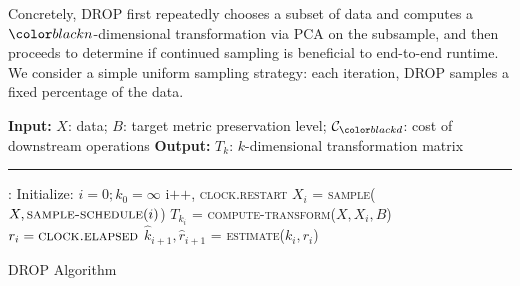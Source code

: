 Concretely, DROP first repeatedly chooses a subset of data and computes a $\dvar$-dimensional transformation via PCA on the subsample, and then proceeds to determine if continued sampling is beneficial to end-to-end runtime.
We consider a simple uniform sampling strategy: each iteration, DROP samples a fixed percentage of the data.
 
 
 
 
 


\begin{algorithm}[t!]
\begin{algorithmic}[1]
\small
\Statex \textbf{Input:}  $X$: data; $B$: target metric preservation level; $\mathcal{C}_\mvar$: cost of downstream operations
\Statex \textbf{Output:} $T_k$: $k$-dimensional transformation matrix
\Statex
\Statex \hrule
{}:
	\State Initialize: $i = 0; k_0 = \infty$ 
	\Do
		\State i$\texttt{++}$, \textsc{clock.restart}
		\State $X_i$ = \textsc{sample}($X, \textsc{sample-schedule}(i)$) \label{eq:sample}
			\Comment{\S~\ref{subsec:psample}}
		\State $T_{k_i}$ = \textsc{compute-transform}($X, X_i,  B$) \label{eq:evaluate}
			\Comment{\S~\ref{subsec:teval}}
		\State $r_i = \textsc{clock.elapsed}$	
		\State $\hat{k}_{i+1}, \hat{r}_{i+1} $ = \textsc{estimate}($k_i, r_i$) \label{eq:estimate}
			\Comment{\S~\ref{subsec:pest}}
	 \label{eq:optimize}
		\Comment{\S~\ref{subsec:opt}}
	\\
\EndFunction
\end{algorithmic}
\caption{DROP Algorithm}
\label{alg:DROP}
\end{algorithm}



